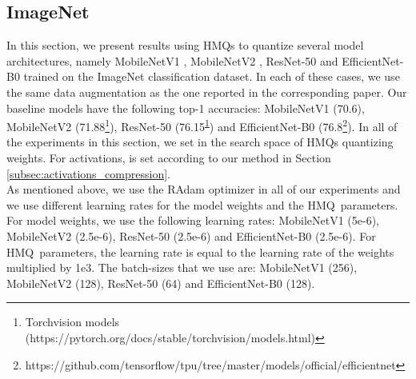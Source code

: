 \documentclass{article}
\newcommand{\qb}{HMQ}
\begin{document}
\subsection{ImageNet}\label{subsec:imagenet}
In this section, we present results using \qb s to quantize several model architectures, namely MobileNetV1 \cite{howard2017mobilenets}, MobileNetV2 \cite{sandler2018mobilenetv2}, ResNet-50 \cite{he2016deep} and EfficientNet-B0 \cite{tan2019efficientnet} trained on the ImageNet \cite{deng2009imagenet} classification dataset.
In each of these cases, we use the same data augmentation as the one reported in the corresponding paper.
Our baseline models have the following top-1 accuracies: MobileNetV1 (70.6), MobileNetV2 (71.88\footnote{\label{foot:torchvision}Torchvision models (https://pytorch.org/docs/stable/torchvision/models.html)}), ResNet-50 (76.15\textsuperscript{\ref{foot:torchvision}}) and EfficientNet-B0 (76.8\footnote{https://github.com/tensorflow/tpu/tree/master/models/official/efficientnet}).
In all of the experiments in this section, we set  in the search space of \qb s quantizing weights.
For activations,  is set according to our method in Section \ref{subsec:activations_compression}. \\


As mentioned above, we use the RAdam optimizer in all of our experiments and we use different learning rates for the model weights and the \qb\ parameters.
For model weights, we use the following learning rates: MobileNetV1 (5e-6), MobileNetV2 (2.5e-6), ResNet-50 (2.5e-6) and EfficientNet-B0 (2.5e-6). 
For \qb\ parameters, the learning rate is equal to the learning rate of the weights multiplied by 1e3. 
The batch-sizes that we use are: MobileNetV1 (256), MobileNetV2 (128), ResNet-50 (64) and EfficientNet-B0 (128).
\end{document}
